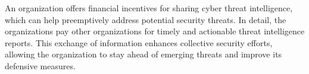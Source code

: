 An organization offers financial incentives for sharing cyber threat intelligence, which can help preemptively address potential security threats. In detail, the organizations pay other organizations for timely and actionable threat intelligence reports. This exchange of information enhances collective security efforts, allowing the organization to stay ahead of emerging threats and improve its defensive measures.